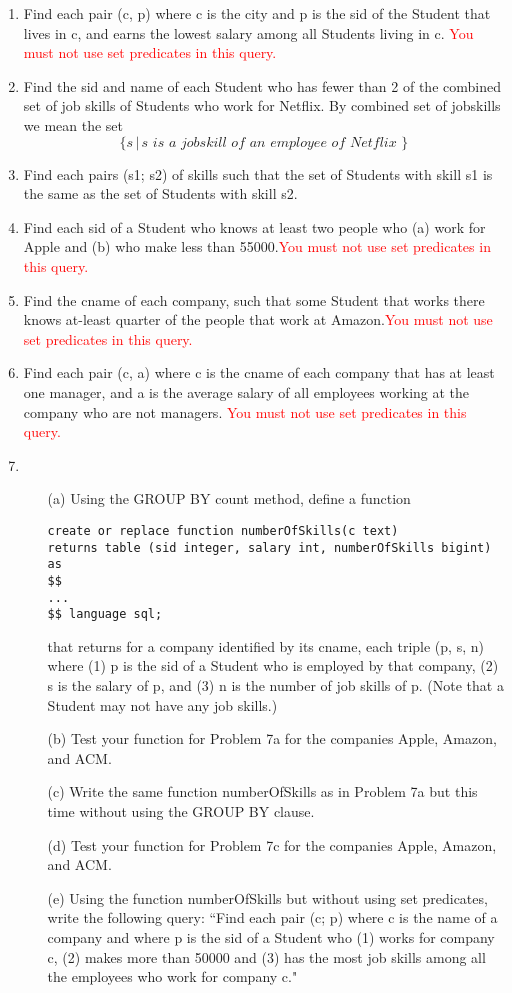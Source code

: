 \documentclass{article}
\begin{document}
\begin{enumerate}
    \item Find each pair (c, p) where c is the city and p is the sid
of the Student that lives in c, and earns the lowest salary
among all Students living in c. \textcolor{red}{You must not use set predicates
in this query.} 
    \item Find the sid and name of each Student who has fewer than 2 of
the combined set of job skills of Students who work for Netflix. By
combined set of jobskills we mean the set
\[\{s \,|\, s\,\, is\,\, a \,\,jobskill\,\, of\,\, an\,\, employee\,\, of\,\, Netflix\,\,\}\]
    \item Find each pairs (s1; s2) of skills such
that the set of Students with skill s1 is the same as the set of
Students with skill s2.  
    \item Find each sid of a Student who
knows at least two people who (a) work for Apple and
 (b) who make less than 55000.\textcolor{red}{You must not use set predicates
in this query.} 
    \item Find the cname of each company, such that some Student
that works there knows at-least quarter of the people that work
at Amazon.\textcolor{red}{You must not use set predicates
in this query.} 
    \item Find each pair (c, a) where c is the cname of each company
that has at least one manager, and a is the average salary
of all employees working at the company who are not managers. \textcolor{red}{You must not use set predicates
in this query.} 
\item 
\begin{itemize}
    \item [(a)]Using the GROUP BY count method, define a function
        \begin{verbatim}
create or replace function numberOfSkills(c text)
returns table (sid integer, salary int, numberOfSkills bigint) as
$$
...
$$ language sql;
    \end{verbatim}
    that returns for a company identified by its cname, each triple
(p, s, n) where (1) p is the sid of a Student who is employed
by that company, (2) s is the salary of p, and (3) n is the
number of job skills of p. (Note that a Student may not have
any job skills.)
\item[(b)] Test your function for Problem 7a for the companies Apple,
Amazon, and ACM.
\item[(c)] Write the same function numberOfSkills as in Problem 7a
but this time without using the GROUP BY clause.
\item[(d)] Test your function for Problem 7c for the companies Apple,
Amazon, and ACM.
\item[(e)] Using the function numberOfSkills but without using set
predicates, write the following query: ``Find each pair (c; p)
where c is the name of a company and where p is the sid of
a Student who (1) works for company c, (2) makes more than
50000 and (3) has the most job skills among all the employees
who work for company c."
\end{itemize}

\end{enumerate}
\end{document}
